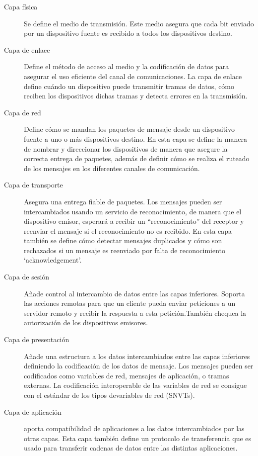 \begin{description}
	\item[Capa física] Se define el medio de transmisión. Este medio asegura que
cada bit enviado por un dispositivo fuente es recibido a todos
los dispositivos destino.
	\item[Capa de enlace]Define el método de acceso al medio y la codificación
de datos para asegurar el uso eficiente del canal de comunicaciones. La
capa de enlace define cu\'ando un dispositivo puede transmitir tramas de
datos, cómo reciben los dispositivos dichas tramas y detecta errores en
la transmisión.
	\item[Capa de red]Define cómo se mandan los paquetes de mensaje desde
un dispositivo fuente a uno o m\'as dispositivos destino. En esta capa se
define la manera de nombrar y direccionar los dispositivos de manera
que asegure la correcta entrega de paquetes, adem\'as de definir cómo
se realiza el ruteado de los mensajes en los diferentes canales de
comunicación.
	\item[Capa de transporte]Asegura una entrega fiable de paquetes. Los
mensajes pueden ser intercambiados usando un servicio de
reconocimiento, de manera que el dispositivo emisor, esperar\'a a recibir
un “reconocimiento” del receptor y reenviar el mensaje si el
reconocimiento no es recibido. En esta capa también se define cómo
detectar mensajes duplicados y cómo son rechazados si un mensaje es
reenviado por falta de reconocimiento ‘acknowledgement’.
	\item[Capa de sesión]Añade control al intercambio de datos entre las capas
inferiores. Soporta las acciones remotas para que un cliente pueda
enviar peticiones a un servidor remoto y recibir la respuesta a esta
petición.También chequea la autorización de los dispositivos emisores.
	\item[Capa de presentación]Añade una estructura a los datos intercambiados
entre las capas inferiores definiendo la codificación de los datos de
mensaje. Los mensajes pueden ser codificados como variables de
red, mensajes de aplicación, o tramas externas. La codificación
interoperable de las variables de red se consigue con el est\'andar de los
tipos devariables de red (SNVTs).
	\item[Capa de aplicación]aporta compatibilidad de aplicaciones a los datos
intercambiados por las otras capas. Esta capa también define un
protocolo de transferencia que es usado para transferir cadenas de
datos entre las distintas aplicaciones.
\end{description}

